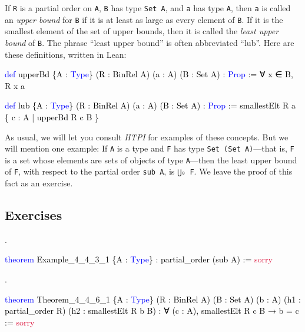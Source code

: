 \documentclass[
  letterpaper,
  DIV=11,
  numbers=noendperiod]{scrreprt}
\newenvironment{Shaded}{\begin{snugshade}}{\end{snugshade}}
\newcommand{\ConstantTok}[1]{\textcolor[rgb]{0.56,0.35,0.01}{#1}}
\newcommand{\KeywordTok}[1]{\textcolor[rgb]{0.00,0.23,0.31}{#1}}
\newcommand{\NormalTok}[1]{\textcolor[rgb]{0.00,0.23,0.31}{#1}}
\renewcommand{\NormalTok}[1]{\textcolor[HTML]{000000}{#1}}
\renewcommand{\KeywordTok}[1]{\textcolor[HTML]{0000FF}{#1}}
\renewcommand{\ConstantTok}[1]{\textcolor[HTML]{DC143C}{#1}}
\newcommand{\nobreakShaded}{\renewenvironment{Shaded}
	{\begin{tcolorbox}[frame hidden, enhanced, interior hidden, boxrule=0pt,
		borderline west={3pt}{0pt}{shadecolor}, sharp corners]}
	{\end{tcolorbox}}}
\newenvironment{numex}[1]
	{\begin{minipage}[t]{0.04\textwidth}\vspace{8pt}{#1}.
		\end{minipage}\nobreakShaded\begin{minipage}[t]{0.96\textwidth}\vspace{0pt}}
	{\end{minipage}}
\theoremstyle{remark}
\begin{document}
If \texttt{R} is a partial order on \texttt{A}, \texttt{B} has type
\texttt{Set\ A}, and \texttt{a} has type \texttt{A}, then \texttt{a} is
called an \emph{upper bound} for \texttt{B} if it is at least as large
as every element of \texttt{B}. If it is the smallest element of the set
of upper bounds, then it is called the \emph{least upper bound} of
\texttt{B}. The phrase ``least upper bound'' is often abbreviated
``lub''. Here are these definitions, written in Lean:

\begin{Shaded}
\begin{Highlighting}[]
\KeywordTok{def}\NormalTok{ upperBd \{A : }\KeywordTok{Type}\NormalTok{\} (R : BinRel A) (a : A) (B : Set A) : }\KeywordTok{Prop}\NormalTok{ :=}
\NormalTok{  ∀ x ∈ B, R x a}

\KeywordTok{def}\NormalTok{ lub \{A : }\KeywordTok{Type}\NormalTok{\} (R : BinRel A) (a : A) (B : Set A) : }\KeywordTok{Prop}\NormalTok{ :=}
\NormalTok{  smallestElt R a \{ c : A | upperBd R c B \}}
\end{Highlighting}
\end{Shaded}

As usual, we will let you consult \emph{HTPI} for examples of these
concepts. But we will mention one example: If \texttt{A} is a type and
\texttt{F} has type \texttt{Set\ (Set\ A)}---that is, \texttt{F} is a
set whose elements are sets of objects of type \texttt{A}---then the
least upper bound of \texttt{F}, with respect to the partial order
\texttt{sub\ A}, is \texttt{⋃₀\ F}. We leave the proof of this fact as
an exercise.

\hypertarget{exercises-8}{%
\subsection{Exercises}\label{exercises-8}}

\begin{numex}{1}

\begin{Shaded}
\begin{Highlighting}[]
\KeywordTok{theorem}\NormalTok{ Example\_4\_4\_3\_1 \{A : }\KeywordTok{Type}\NormalTok{\} : partial\_order (sub A) := }\ConstantTok{sorry}
\end{Highlighting}
\end{Shaded}

\end{numex}

\begin{numex}{2}

\begin{Shaded}
\begin{Highlighting}[]
\KeywordTok{theorem}\NormalTok{ Theorem\_4\_4\_6\_1 \{A : }\KeywordTok{Type}\NormalTok{\} (R : BinRel A) (B : Set A) (b : A)}
\NormalTok{    (h1 : partial\_order R) (h2 : smallestElt R b B) :}
\NormalTok{    ∀ (c : A), smallestElt R c B → b = c := }\ConstantTok{sorry}
\end{Highlighting}
\end{Shaded}

\end{numex}
\end{document}
